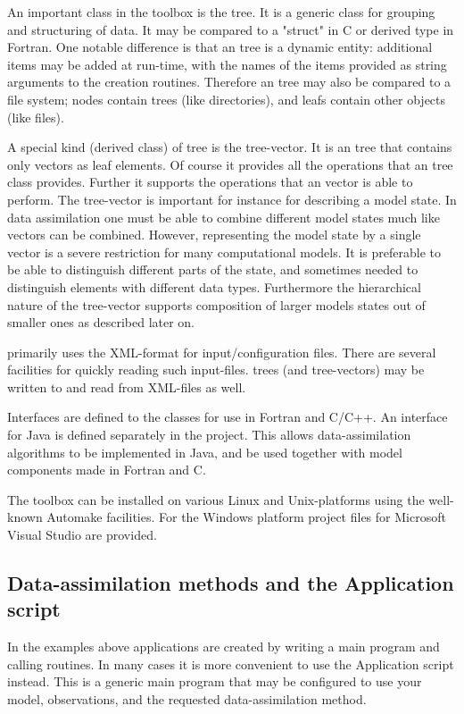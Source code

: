 An important class in the \oda toolbox is the \oda tree. It is a generic class for grouping and structuring of data. It may be compared to a "struct" in C or derived type in Fortran. One notable difference is that an \oda tree is a dynamic entity: additional items may be added at run-time, with the names of the items provided as string arguments to the creation routines. Therefore an \oda tree may also be compared to a file system; nodes contain \oda trees (like directories), and leafs contain other \oda objects (like files).

A special kind (derived class) of \oda tree is the \oda tree-vector. It is an \oda tree that contains only \oda vectors as leaf elements. Of course it provides all the operations that an \oda tree class provides. Further it supports the operations that an \oda vector is able to perform. The \oda tree-vector is important for instance for describing a model state. In data assimilation one must be able to combine different model states much like vectors can be combined. However, representing the model state by a single vector is a severe restriction for many computational models. It is preferable to be able to distinguish different parts of the state, and sometimes needed to distinguish elements with different data types. Furthermore the hierarchical nature of the \oda tree-vector supports composition of larger models states out of smaller ones as described later on.

\oda primarily uses the XML-format for input/configuration files. There are several facilities for quickly reading such input-files. \oda trees (and tree-vectors) may be written to and read from XML-files as well.

Interfaces are defined to the \oda classes for use in Fortran and C/C++. An interface for Java is defined separately in the \oda project. This allows data-assimilation algorithms to be implemented in Java, and be used together with model components made in Fortran and C.

The \oda toolbox can be installed on various Linux and Unix-platforms using the well-known Automake facilities. For the Windows platform project files for Microsoft Visual Studio are provided.

\subsection{Data-assimilation methods and the \oda Application script}

In the examples above \oda applications are created by writing a main program and calling \oda routines. In many cases it is more convenient to use the \oda Application script instead. This is a generic main program that may be configured to use your model, observations, and the requested data-assimilation method.

